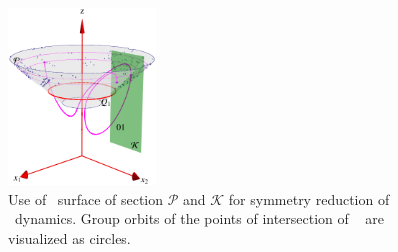 \begin{figure}[ht]
\begin{center}
  \includegraphics[width=0.35\textwidth]{../figs/CLEmartini}
\end{center}
\caption{
Use of \Poincare\ surface of section $\mathcal{P}$ and
{\slice} $\mathcal{K}$ for symmetry reduction of \cLe\
dynamics. Group orbits of the points of intersection of \rpo\
 are visualized as circles.
    }
\label{fig:CLEmartini}
\end{figure}



